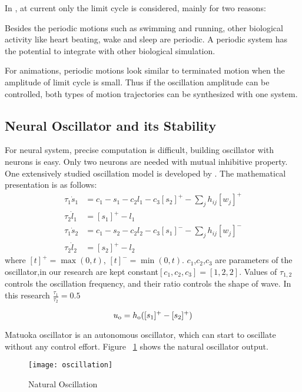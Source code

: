 In \moit, at current only the limit cycle is considered, mainly for two reasons: 
\begin{itemize}
Besides the periodic motions such as swimming and running, other biological activity like heart beating, wake and sleep  are periodic.
A periodic system has the potential to integrate with other biological simulation.

For animations, periodic motions look similar to terminated motion when the amplitude of limit cycle is small. 
Thus if the oscillation amplitude can be controlled, both types of motion trajectories can be synthesized with one system.
\end{itemize}

\subsection{Neural Oscillator and its Stability}
For neural system, precise computation is difficult,  building oscillator with neurons is easy. 
Only two neurons are needed with mutual inhibitive property.
One extensively studied oscillation model is developed by \citet{neurooscillation}. 
The mathematical presentation is as follows:
\begin{align}
\tau_{1} \dot{s}_{1}&=c_1-s_{1}-c_2 l_{1}-c_3 [s_{2}]^{+}-\sum_{j}h_{ij}[w_{j}]^{+} \nonumber\\
\tau_{2} \dot{l}_{1}&=[s_{1}]^{+}-l_{1} \nonumber\\
\tau_{1} \dot{s}_{2}&=c_1-s_{2}-c_2 l_{2}-c_3 [s_{1}]^{-}-\sum_{j}h_{ij}[w_{j}]^{-} \nonumber\\
\tau_{2} \dot{l}_{2}&=[s_{2}]^{+}-l_{2}\label{eq:matsuta}
\end{align}
where $[t]^{+}=\max(0,t)$, $[t]^{-}=\min(0,t)$.
$c_1$,$c_2$,$c_3$ are parameters of the oscillator,in our research are kept constant$[c_1,c_2,c_3]=[1,2,2]$.
Values of $\tau_{1,2}$ controls the oscillation frequency, and their ratio controls the shape of wave.
In this research $\frac{\tau_{1}}{\tau_{2}}=0.5$


\begin{equation}
u_{\mathrm{o}}=h_{\mathrm{o}}([s_{1}]^{+}-[s_{2}]^{+})
\end{equation}







Matuoka oscillator is an autonomous oscillator, which can start to oscillate without any control effort.
Figure ~\ref{fig:natural-oscilation} shows the natural oscillator output.
\begin{figure}[h]
\begin{center}
\texttt{[image: oscillation]}
\caption{Natural Oscillation}
\label{fig:natural-oscilation}
\end{center}
\end{figure}





